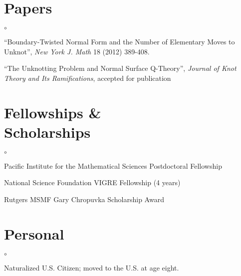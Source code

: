 \documentclass[margin]{res}
\newenvironment{list1}{
  \begin{list}{$\circ$}{
      \setlength{\itemsep}{0.0in}
      \setlength{\parsep}{0in} \setlength{\parskip}{0in}
      \setlength{\topsep}{0in} \setlength{\partopsep}{0in} 
      \setlength{\leftmargin}{0.1in}
      }}
      {\end{list}}
\begin{document}
\begin{resume}
\section{\helv Papers}
\begin{list1}
\item ``Boundary-Twisted Normal Form and the Number of Elementary Moves to Unknot'', \emph{New York J. Math} 18 (2012) 389-408. 
\item ``The Unknotting Problem and Normal Surface Q-Theory'', \emph{Journal of Knot Theory and Its Ramifications}, accepted for publication
\end{list1}
\vspace{-0.1in}

\section{\helv Fellowships \&\\ Scholarships}
\begin{list1}
\item Pacific Institute for the Mathematical Sciences Postdoctoral Fellowship
\item National Science Foundation VIGRE Fellowship (4 years)
\item Rutgers MSMF Gary Chropuvka Scholarship Award
\end{list1}
\vspace{-0.1in}
\section{\helv Personal}
\begin{list1}
\item Naturalized U.S. Citizen; moved to the U.S. at age eight.
\end{list1}

\end{resume}
\end{document}
